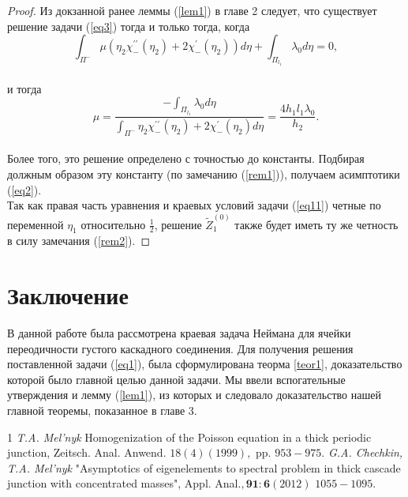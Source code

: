 \documentclass[12pt,titlepage]{report}
\begin{document}
\begin{proof}
	Из докзанной ранее леммы (\ref{lem1}) в главе 2 следует, что существует решение задачи (\ref{eq3}) тогда и только тогда, когда
	$$\int_{\Pi^{-}} \mu \left(\eta_{2} \chi_{-}^{\prime \prime}\left(\eta_{2}\right)+2 \chi_{-}^{\prime}\left(\eta_{2}\right)\right) d \eta + \int_{\Pi_{l_{1}}} \lambda_{0} d \eta = 0,$$\\
	и тогда
	$$\mu= \frac{-\int_{\Pi_{l_{1}}} \lambda_{0} d \eta}{\int_{\Pi^{-}} \eta_{2} \chi_{-}^{\prime \prime}\left(\eta_{2}\right)+2 \chi_{-}^{\prime}\left(\eta_{2}\right) d \eta} =\frac{4 h_{1} l_{1} \lambda_{0}}{h_{2}}.$$ \\
	Более того, это решение определено с точностью до константы. Подбирая должным образом эту константу (по замечанию (\ref{rem1})), получаем асимптотики (\ref{eq2}).\\
	Так как правая часть уравнения и краевых условий задачи (\ref{eq11}) четные по переменной $\eta_{1}$ относительно $\frac{1}{2}$, решение $\widetilde{Z}_{1}^{(0)}$ также будет иметь ту же четность в силу замечания (\ref{rem2}). 
\end{proof}





\newpage
\section*{Заключение}
В данной работе была рассмотрена краевая задача Неймана для ячейки переодичности густого каскадного соединения.  Для получения решения поставленной задачи (\ref{eq1}), была сформулирована теорма \ref{teor1}, доказательство которой было главной целью данной задачи. Мы ввели вспогательные утверждения и лемму (\ref{lem1}), из которых и следовало доказательство нашей главной теоремы, показанное в главе 3.

\newpage
{}
\begin{thebibliography}
	{1}
	\emph {T.A. Mel'nyk} Homogenization of the Poisson equation in a thick periodic junction, Zeitsch. Anal. Anwend. $18(4)(1999),$ pp. $953-975$.
	\emph { G.A. Chechkin, T.A. Mel'nyk} "Asymptotics of eigenelements to spectral problem in thick cascade junction with concentrated masses", Appl. Anal.$, \mathbf{9 1 : 6}(2012)$ $1055-1095$.
\end{thebibliography}
\end{document}
